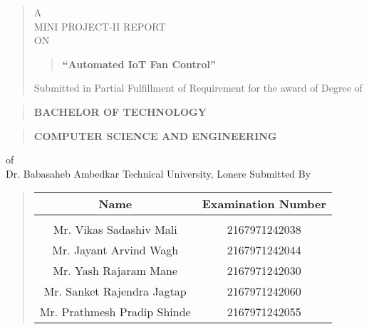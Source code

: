 \documentclass[12pt]{report}
\author{}
\date{}
\begin{document}
	\large
	\centering
	
	\begin{quote}
		\large
		\centering
		A\\MINI PROJECT-II REPORT\\ON
		
		\begin{quote}
			\centering
			
			\textbf{``Automated IoT Fan Control''}
		\end{quote}
		
		Submitted in Partial Fulfillment of Requirement for the award of
		Degree of
	\end{quote}
	
	\begin{quote}
		\centering
		\large
		\textbf{BACHELOR OF TECHNOLOGY}
	\end{quote}
	
	\begin{quote}
		\large
		\centering
		\textbf{COMPUTER SCIENCE AND ENGINEERING}\\
	\end{quote}
	of\\
	Dr. Babasaheb Ambedkar Technical University, Lonere
	Submitted By
	\vspace{0.5cm}
	\begin{quote}
		\normalsize
		\centering
		\begin{table}[ht]
			\centering
			\begin{tabular}{ c  c }
				
				\bfseries
				Name & \bfseries Examination Number \\[1ex]
				\hline\\[1ex]
				Mr. Vikas Sadashiv Mali & 2167971242038\\[1ex]
				Mr. Jayant Arvind Wagh & 2167971242044\\[1ex]
				Mr. Yash Rajaram Mane & 2167971242030\\[1ex]
				Mr. Sanket Rajendra Jagtap & 2167971242060\\[1ex]
				Mr. Prathmesh Pradip Shinde & 2167971242055\\[1ex]
				
				
			\end{tabular}
		\end{table}
	\end{quote}
	
\end{document}
